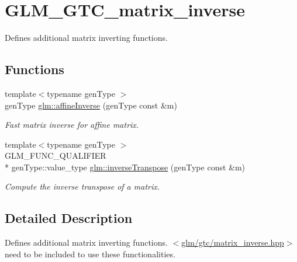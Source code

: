 \hypertarget{group__gtc__matrix__inverse}{\section{G\-L\-M\-\_\-\-G\-T\-C\-\_\-matrix\-\_\-inverse}
\label{group__gtc__matrix__inverse}
}


Defines additional matrix inverting functions.  


\subsection*{Functions}
\begin{DoxyCompactItemize}
\item 
{\footnotesize template$<$typename gen\-Type $>$ }\\gen\-Type \hyperlink{group__gtc__matrix__inverse_ga644904b05dab519821fdaaa643ac9c0c}{glm\-::affine\-Inverse} (gen\-Type const \&m)
\begin{DoxyCompactList}\small\item\em Fast matrix inverse for affine matrix. \end{DoxyCompactList}\item 
{\footnotesize template$<$typename gen\-Type $>$ }\\G\-L\-M\-\_\-\-F\-U\-N\-C\-\_\-\-Q\-U\-A\-L\-I\-F\-I\-E\-R \\*
gen\-Type\-::value\-\_\-type \hyperlink{group__gtc__matrix__inverse_ga5fd97e07f032af2b5a4698b6bf0b9ecc}{glm\-::inverse\-Transpose} (gen\-Type const \&m)
\begin{DoxyCompactList}\small\item\em Compute the inverse transpose of a matrix. \end{DoxyCompactList}\end{DoxyCompactItemize}


\subsection{Detailed Description}
Defines additional matrix inverting functions. $<$\hyperlink{matrix__inverse_8hpp}{glm/gtc/matrix\-\_\-inverse.\-hpp}$>$ need to be included to use these functionalities. 

